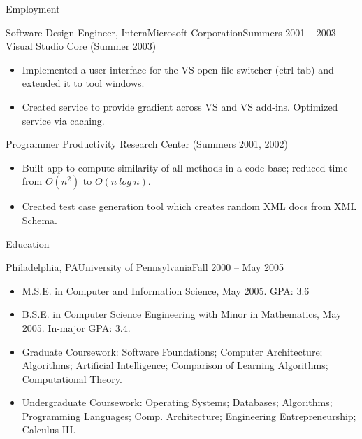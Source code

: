 \documentclass[]{mcdowellcv}
\begin{document}
\begin{cvsection}{Employment}
		\begin{cvsubsection}{Software Design Engineer, Intern}{Microsoft Corporation}{Summers 2001 -- 2003}
			Visual Studio Core (Summer 2003)		
			\begin{itemize}
				\item Implemented a user interface for the VS open file switcher (ctrl-tab) and extended it to tool windows.
				\item Created service to provide gradient across VS and VS add-ins. Optimized service via caching.
			\end{itemize}
			Programmer Productivity Research Center (Summers 2001, 2002)
			\begin{itemize}
				\item Built app to compute similarity of all methods in a code base; reduced time from $O(n^2)$ to $O(n\ log\ n)$. 
				\item Created test case generation tool which creates random XML docs from XML Schema.
			\end{itemize}
		\end{cvsubsection}
	\end{cvsection}
	
	\begin{cvsection}{Education}
		\begin{cvsubsection}{Philadelphia, PA}{University of Pennsylvania}{Fall 2000 -- May 2005}
			\begin{itemize}
				\item M.S.E. in Computer and Information Science, May 2005. GPA: 3.6
				\item B.S.E. in Computer Science Engineering with Minor in Mathematics, May 2005.  In-major GPA: 3.4.
				\item Graduate Coursework: Software Foundations; Computer Architecture; Algorithms; Artificial Intelligence; Comparison of Learning Algorithms; Computational Theory.
				\item Undergraduate Coursework: Operating Systems; Databases; Algorithms; Programming Languages; Comp. Architecture; Engineering Entrepreneurship; Calculus III.
			\end{itemize}
		\end{cvsubsection}
	\end{cvsection}
	
\end{document}
